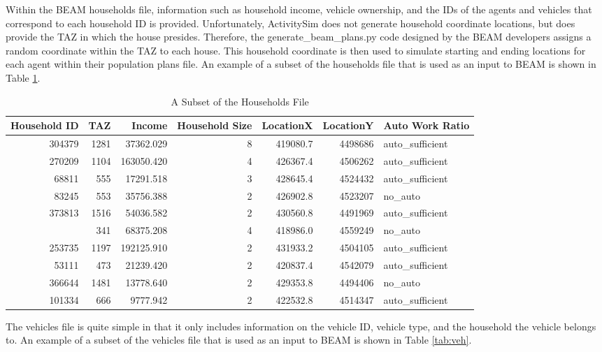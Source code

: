 \documentclass[12pt, oneside, openright]{byuthesis}
\begin{document}
Within the BEAM households file, information such as household income, vehicle ownership, and the IDs of the agents and vehicles that correspond to each household ID is provided. Unfortunately, ActivitySim does not generate household coordinate locations, but does provide the TAZ in which the house presides. Therefore, the generate\_beam\_plans.py code designed by the BEAM developers assigns a random coordinate within the TAZ to each house. This household coordinate is then used to simulate starting and ending locations for each agent within their population plans file. An example of a subset of the households file that is used as an input to BEAM is shown in Table \ref{tab:house}.

\begin{table}

\caption{\label{tab:house}A Subset of the Households File}
\centering
\begin{tabular}[t]{rrrrrrl}
\toprule
Household ID & TAZ & Income & Household Size & LocationX & LocationY & Auto Work Ratio\\
\midrule
304379 & 1281 & 37362.029 & 8 & 419080.7 & 4498686 & auto\_sufficient\\
270209 & 1104 & 163050.420 & 4 & 426367.4 & 4506262 & auto\_sufficient\\
68811 & 555 & 17291.518 & 3 & 428645.4 & 4524432 & auto\_sufficient\\
83245 & 553 & 35756.388 & 2 & 426902.8 & 4523207 & no\_auto\\
373813 & 1516 & 54036.582 & 2 & 430560.8 & 4491969 & auto\_sufficient\\
\addlinespace
574302 & 341 & 68375.208 & 4 & 418986.0 & 4559249 & no\_auto\\
253735 & 1197 & 192125.910 & 2 & 431933.2 & 4504105 & auto\_sufficient\\
53111 & 473 & 21239.420 & 2 & 420837.4 & 4542079 & auto\_sufficient\\
366644 & 1481 & 13778.640 & 2 & 429353.8 & 4494406 & no\_auto\\
101334 & 666 & 9777.942 & 2 & 422532.8 & 4514347 & auto\_sufficient\\
\bottomrule
\end{tabular}
\end{table}

The vehicles file is quite simple in that it only includes information on the vehicle ID, vehicle type, and the household the vehicle belongs to. An example of a subset of the vehicles file that is used as an input to BEAM is shown in Table \ref{tab:veh}.
\end{document}

